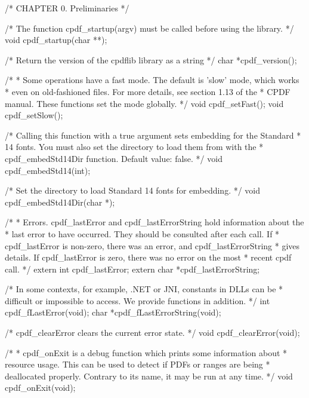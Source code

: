 /* CHAPTER 0. Preliminaries */

/* The function cpdf_startup(argv) must be called before using the library. */
void cpdf_startup(char **);

/* Return the version of the cpdflib library as a string */
char *cpdf_version();

/*
 * Some operations have a fast mode. The default is 'slow' mode, which works
 * even on old-fashioned files. For more details, see section 1.13 of the
 * CPDF manual. These functions set the mode globally.
 */
void cpdf_setFast();
void cpdf_setSlow();

/* Calling this function with a true argument sets embedding for the Standard
 * 14 fonts.  You must also set the directory to load them from with the
 * cpdf_embedStd14Dir function. Default value: false. */
void cpdf_embedStd14(int);

/* Set the directory to load Standard 14 fonts for embedding. */
void cpdf_embedStd14Dir(char *);

/*
 * Errors. cpdf_lastError and cpdf_lastErrorString hold information about the
 * last error to have occurred. They should be consulted after each call. If
 * cpdf_lastError is non-zero, there was an error, and cpdf_lastErrorString
 * gives details. If cpdf_lastError is zero, there was no error on the most
 * recent cpdf call.
 */
extern int cpdf_lastError;
extern char *cpdf_lastErrorString;

/* In some contexts, for example, .NET or JNI, constants in DLLs can be
 * difficult or impossible to access. We provide functions in addition. */
int cpdf_fLastError(void);
char *cpdf_fLastErrorString(void);

/* cpdf_clearError clears the current error state. */
void cpdf_clearError(void);

/*
 * cpdf_onExit is a debug function which prints some information about
 * resource usage. This can be used to detect if PDFs or ranges are being
 * deallocated properly. Contrary to its name, it may be run at any time.
 */
void cpdf_onExit(void);

